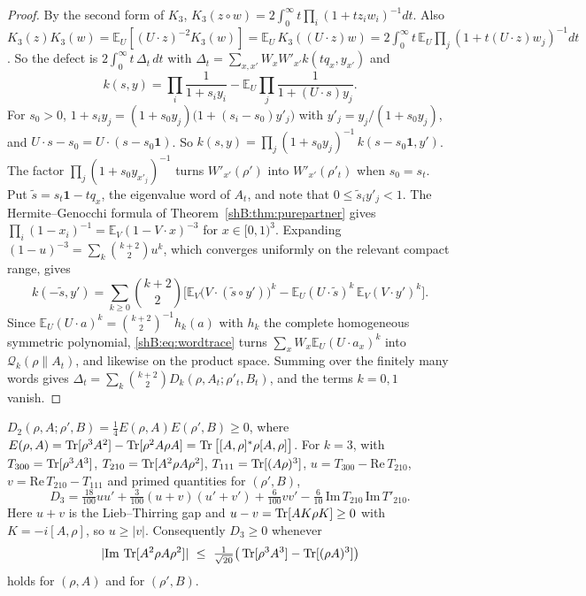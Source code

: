 \begin{proof}
By the second form of $K_3$, $K_3(z\circ w)=2\int_0^\infty t\prod_i(1+tz_iw_i)^{-1}dt$. Also $K_3(z)K_3(w)=\mathbb E_U[(U\cdot z)^{-2}K_3(w)]=\mathbb E_U\,K_3((U\cdot z)w)=2\int_0^\infty t\,\mathbb E_U\prod_j(1+t(U\cdot z)w_j)^{-1}dt$. So the defect is $2\int_0^\infty t\,\Delta_t\,dt$ with $\Delta_t=\sum_{x,x'}W_xW'_{x'}k(tq_x,y_{x'})$ and
\[
k(s,y)=\prod_i\frac1{1+s_iy_i}-\mathbb E_U\prod_j\frac1{1+(U\cdot s)y_j}.
\]
For $s_0>0$, $1+s_iy_j=(1+s_0y_j)\big(1+(s_i-s_0)y'_j\big)$ with $y'_j=y_j/(1+s_0y_j)$, and $U\cdot s-s_0=U\cdot(s-s_0\mathbf 1)$. So $k(s,y)=\prod_j(1+s_0y_j)^{-1}\,k(s-s_0\mathbf 1,y')$. The factor $\prod_j(1+s_0y_{x'_j})^{-1}$ turns $W'_{x'}(\rho')$ into $W'_{x'}(\rho'_t)$ when $s_0=s_t$. Put $\tilde s=s_t\mathbf 1-tq_x$, the eigenvalue word of $A_t$, and note that $0\le\tilde s_iy'_j<1$. The Hermite--Genocchi formula of Theorem~\ref{shB:thm:purepartner} gives $\prod_i(1-x_i)^{-1}=\mathbb E_V(1-V\cdot x)^{-3}$ for $x\in[0,1)^3$. Expanding $(1-u)^{-3}=\sum_k\binom{k+2}2u^k$, which converges uniformly on the relevant compact range, gives
\[
k(-\tilde s,y')=\sum_{k\ge0}\binom{k+2}2\Big[\mathbb E_V\big(V\cdot(\tilde s\circ y')\big)^k-\mathbb E_U(U\cdot\tilde s)^k\,\mathbb E_V(V\cdot y')^k\Big].
\]
Since $\mathbb E_U(U\cdot a)^k=\binom{k+2}2^{-1}h_k(a)$ with $h_k$ the complete homogeneous symmetric polynomial, \eqref{shB:eq:wordtrace} turns $\sum_xW_x\mathbb E_U(U\cdot a_x)^k$ into $\mathcal Q_k(\rho\|A_t)$, and likewise on the product space. Summing over the finitely many words gives $\Delta_t=\sum_k\binom{k+2}2D_k(\rho,A_t;\rho'_t,B_t)$, and the terms $k=0,1$ vanish.
\end{proof}

\begin{proposition}\label{shB:prop:D2}
$D_2(\rho,A;\rho',B)=\frac14E(\rho,A)E(\rho',B)\ge0$, where $E(\rho,A)=\operatorname{Tr}[\rho^3A^2]-\operatorname{Tr}[\rho^2A\rho A]=\operatorname{Tr}\big[[A,\rho]^*\rho[A,\rho]\big]$. For $k=3$, with $T_{300}=\operatorname{Tr}[\rho^3A^3]$, $T_{210}=\operatorname{Tr}[A^2\rho A\rho^2]$, $T_{111}=\operatorname{Tr}[(A\rho)^3]$, $u=T_{300}-\mathrm{Re}\,T_{210}$, $v=\mathrm{Re}\,T_{210}-T_{111}$ and primed quantities for $(\rho',B)$,
\[
D_3=\tfrac{18}{100}uu'+\tfrac3{100}(u+v)(u'+v')+\tfrac6{100}vv'-\tfrac6{10}\,\mathrm{Im}\,T_{210}\,\mathrm{Im}\,T'_{210} .
\]
Here $u+v$ is the Lieb--Thirring gap and $u-v=\operatorname{Tr}[AK\rho K]\ge0$ with $K=-i[A,\rho]$, so $u\ge|v|$. Consequently $D_3\ge0$ whenever
\begin{equation}\label{shB:eq:chiral}
|\mathrm{Im}\,\Tr[A^2\rho A\rho^2]|\ \le\ \tfrac1{\sqrt{20}}\big(\Tr[\rho^3A^3]-\Tr[(\rho A)^3]\big)
\end{equation}
holds for $(\rho,A)$ and for $(\rho',B)$.
\end{proposition}

